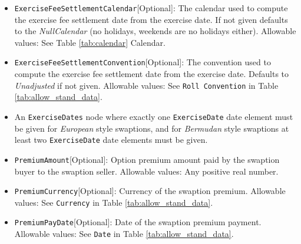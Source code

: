 \begin{itemize}
\item \lstinline!ExerciseFeeSettlementCalendar![Optional]: The calendar used to compute the exercise fee settlement date from the
  exercise date. If not given defaults to the \emph{NullCalendar} (no holidays, weekends are no holidays either). Allowable values: See Table \ref{tab:calendar} Calendar.

\item \lstinline!ExerciseFeeSettlementConvention![Optional]: The convention used to compute the exercise fee settlement date from
  the exercise date. Defaults to \emph{Unadjusted} if not given. Allowable values: See \lstinline!Roll Convention! in Table \ref{tab:allow_stand_data}.

\item An \lstinline!ExerciseDates! node where exactly one \lstinline!ExerciseDate! date element must be given for \emph{European} style swaptions, and for \emph{Bermudan} style swaptions  at least two \lstinline!ExerciseDate! date elements must be given. \\

\item \lstinline!PremiumAmount![Optional]: Option premium amount paid by the swaption buyer to the swaption seller. Allowable values:  Any positive real number.

\item \lstinline!PremiumCurrency![Optional]: Currency of the swaption premium. Allowable values:  See \lstinline!Currency! in Table \ref{tab:allow_stand_data}.

\item \lstinline!PremiumPayDate![Optional]: Date of the swaption premium payment. Allowable values:  See \lstinline!Date! in Table \ref{tab:allow_stand_data}.


\end{itemize}



